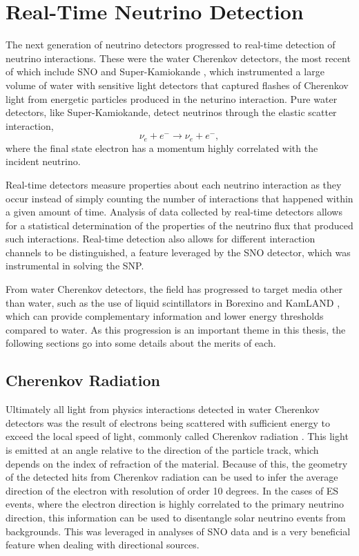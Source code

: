 \section{Real-Time Neutrino Detection}

The next generation of neutrino detectors progressed to real-time detection of neutrino interactions.
These were the water Cherenkov detectors, the most recent of which include SNO \cite{3phase} and Super-Kamiokande \cite{superk}, which instrumented a large volume of water with sensitive light detectors that captured flashes of Cherenkov light from energetic particles produced in the neturino interaction.
Pure water detectors, like Super-Kamiokande, detect neutrinos through the elastic scatter interaction,
\begin{equation}
\nu_e + e^- \rightarrow \nu_e + e^-,
\end{equation}
where the final state electron has a momentum highly correlated with the incident neutrino.

Real-time detectors measure properties about each neutrino interaction as they occur instead of simply counting the number of interactions that happened within a given amount of time.
Analysis of data collected by real-time detectors allows for a statistical determination of the properties of the neutrino flux that produced such interactions.
Real-time detection also allows for different interaction channels to be distinguished, a feature leveraged by the SNO detector, which was instrumental in solving the SNP.

From water Cherenkov detectors, the field has progressed to target media other than water, such as the use of liquid scintillators in Borexino \cite{borexino} and KamLAND \cite{kamland}, which can provide complementary information and lower energy thresholds compared to water.
As this progression is an important theme in this thesis, the following sections go into some details about the merits of each.

\subsection{Cherenkov Radiation}

Ultimately all light from physics interactions detected in water Cherenkov detectors was the result of electrons being scattered with sufficient energy to exceed the local speed of light, commonly called Cherenkov radiation \cite{cherenkov}.
This light is emitted at an angle relative to the direction of the particle track, which depends on the index of refraction of the material.
Because of this, the geometry of the detected hits from Cherenkov radiation can be used to infer the average direction of the electron with resolution of order 10 degrees.
In the cases of ES events, where the electron direction is highly correlated to the primary neutrino direction, this information can be used to disentangle solar neutrino events from backgrounds.
This was leveraged in analyses of SNO data and is a very beneficial feature when dealing with directional sources.

